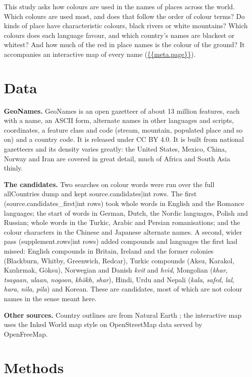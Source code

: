 \documentclass[11pt,a4paper]{article}
\begin{document}
This study asks how colours are used in the names of places across the world. Which colours are used most, and does that follow the order of colour terms? Do kinds of place have characteristic colours, black rivers or white mountains? Which colours does each language favour, and which country's names are blackest or whitest? And how much of the red in place names is the colour of the ground? It accompanies an interactive map of every name (\url{{{meta.page}}}).

\section{Data}
\textbf{GeoNames.} GeoNames \citep{geonames} is an open gazetteer of about 13 million features, each with a name, an ASCII form, alternate names in other languages and scripts, coordinates, a feature class and code (stream, mountain, populated place and so on) and a country code. It is released under CC BY 4.0. It is built from national gazetteers and its density varies greatly: the United States, Mexico, China, Norway and Iran are covered in great detail, much of Africa and South Asia thinly.

\textbf{The candidates.} Two searches on colour words were run over the full allCountries dump and kept {{source.candidates|int}} rows. The first ({{source.candidates_first|int}} rows) took whole words in English and the Romance languages; the start of words in German, Dutch, the Nordic languages, Polish and Russian; whole words in the Turkic, Arabic and Persian romanisations; and the colour characters in the Chinese and Japanese alternate names. A second, wider pass ({{supplement.rows|int}} rows) added compounds and languages the first had missed: English compounds in Britain, Ireland and the former colonies (Blackburn, Whitby, Greenwich, Redcar), Turkic compounds (Aksu, Karakol, Kızılırmak, Göksu), Norwegian and Danish \textit{kvit} and \textit{hvid}, Mongolian (\textit{khar}, \textit{tsagaan}, \textit{ulaan}, \textit{nogoon}, \textit{khökh}, \textit{shar}), Hindi, Urdu and Nepali (\textit{kala}, \textit{safed}, \textit{lal}, \textit{hara}, \textit{nila}, \textit{pila}) and Korean. These are candidates, most of which are not colour names in the sense meant here.

\textbf{Other sources.} Country outlines are from Natural Earth \citep{naturalearth}; the interactive map uses the Inked World map style \citep{inkmap} on OpenStreetMap data served by OpenFreeMap.

\section{Methods}
\end{document}
